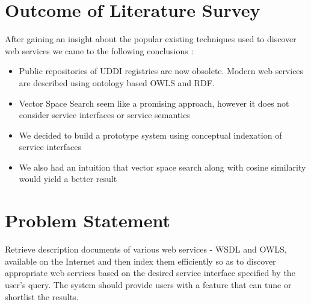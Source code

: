 \documentclass[12pt, oneside]{book}
\begin{document}
\section{Outcome of Literature Survey}
After gaining an insight about the popular existing techniques used to discover web services we came to the following conclusions :
\begin{itemize}
 \item Public repositories of UDDI registries are now obsolete. Modern web services are described using ontology based OWLS and RDF.
 \item Vector Space Search seem like a promising approach, however it does not consider service interfaces or service semantics
 \item We decided to build a prototype system using conceptual indexation of service interfaces
 \item We also had an intuition that vector space search along with cosine similarity would yield a better result
\end{itemize}

\section{Problem Statement}
Retrieve description documents of various web services - WSDL and OWLS, available on the Internet and then index them efficiently so as to discover appropriate web services based on the desired service interface specified by the user's query. The system should provide users with a feature that can tune or shortlist the results.
\end{document}
